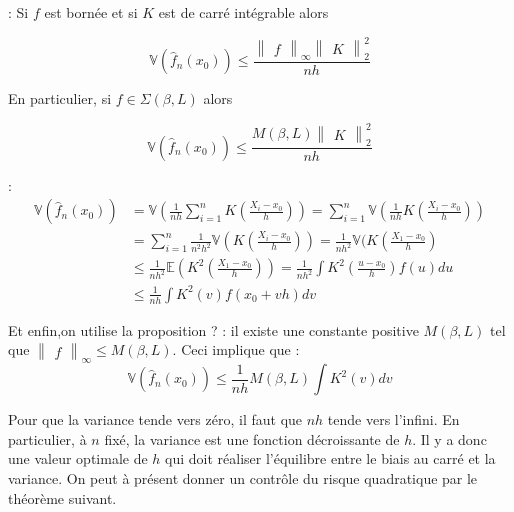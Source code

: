 \documentclass[
]{book}
\begin{document}
\begin{prop}: Si $f$ est bornée et si $K$ est de carré intégrable alors 

$$
\mathbb{V}(\hat {f}_n(x_0)) \leqslant \frac{\begin{Vmatrix}f\end{Vmatrix}_{\infty}\begin{Vmatrix}K\end{Vmatrix}^2_2}{nh}
$$

En particulier, si $f \in \Sigma(\beta,L)$ alors

$$
\mathbb{V}(\hat {f}_n(x_0)) \leqslant \frac{M(\beta, L)\begin{Vmatrix}K\end{Vmatrix}^2_2}{nh}
$$

\end{prop}
\begin{demo}:
$$
\begin{aligned}
\mathbb{V}(\hat {f}_n(x_0)) &= \mathbb{V}(\frac{1}{nh}\sum_{i=1}^nK(\frac{X_i-x_0}{h})) 
=\sum_{i=1}^n\mathbb{V}(\frac{1}{nh}K(\frac{X_i-x_0}{h})) \\
&=\sum_{i=1}^n\frac{1}{n^2h^2}\mathbb{V}(K(\frac{X_i-x_0}{h})) 
=\frac{1}{nh^2}\mathbb{V}(K(\frac{X_1-x_0}{h}) \\
&\leqslant \frac{1}{nh^2}\mathbb{E}(K^2(\frac{X_1-x_0}{h})) 
=\frac{1}{nh^2}\int K^2(\frac{u-x_0}{h})f(u)du \\
&\leqslant\frac{1}{nh}\int K^2(v)f(x_0 +vh)dv
\end{aligned}
$$ 

Et enfin,on utilise la proposition ? : il existe une constante positive $M(\beta,L)$ tel que $\begin{Vmatrix}f\end{Vmatrix}_{\infty} \leqslant M(\beta, L)$. Ceci implique que :
$$
 \mathbb{V}(\hat {f}_n(x_0))\leqslant\frac{1}{nh}M(\beta, L)\int K^2(v)dv 
$$ 
 \end{demo}

\begin{corol} Pour que la variance tende vers zéro, il faut que $nh$ tende vers l'infini. En particulier, à $n$ fixé, la variance est une fonction décroissante de $h$. Il y a donc une valeur optimale de $h$ qui doit réaliser l'équilibre entre le biais au carré et la variance. On peut à présent donner un contrôle du risque quadratique par le théorème suivant.
\end{corol}
\end{document}
